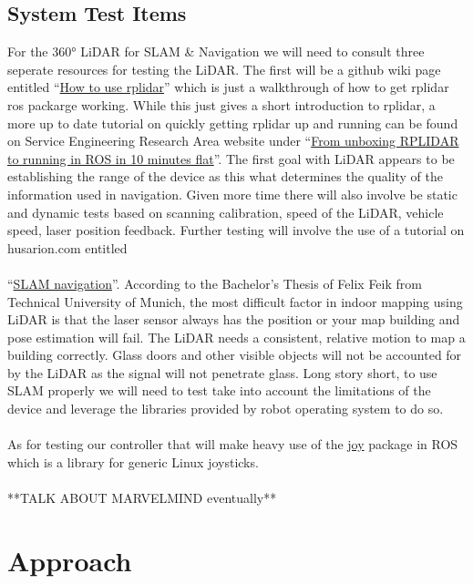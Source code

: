 \documentclass[english,12pt]{article}
\begin{document}
\subsection{System Test Items}
For the \ang{360} LiDAR for SLAM \& Navigation we will need to consult three seperate 
resources for testing the LiDAR. The first will be a github wiki page entitled 
``\href{https://github.com/robopeak/rplidar_ros/wiki/How-to-use-rplidar}{How to use rplidar}'' 
which is just a walkthrough of how to get rplidar ros packarge working. While this just gives 
a short introduction to rplidar, a more up to date tutorial on quickly getting rplidar up and 
running can be found on Service Engineering Research Area website under 
``\href{https://blog.zhaw.ch/icclab/rplidar/}{From unboxing RPLIDAR to running in ROS in 10 
minutes flat}''. The first goal with LiDAR appears to be establishing the range of the device 
as this what determines the quality of the information used in navigation. Given more time 
there will also involve be static and dynamic tests based on scanning calibration, 
speed of the LiDAR, vehicle speed, laser position feedback. Further testing will involve the use 
of a tutorial on husarion.com entitled \\\\
``\href{https://husarion.com/tutorials/ros-tutorials/6-slam-navigation/}{SLAM navigation}''. 
According to the Bachelor's Thesis of Felix Feik from Technical University of Munich,
the most difficult factor in indoor mapping using LiDAR is that the laser sensor always has 
the position or your map building and pose estimation will fail. The LiDAR needs a consistent, 
relative motion to map a building correctly. Glass doors and other visible objects will not 
be accounted for by the LiDAR as the signal will not penetrate glass. Long story short, to use 
SLAM properly we will need to test take into account the limitations of the device and leverage 
the libraries provided by robot operating system to do so. \\\\

As for testing our controller that will make heavy use of the 
\href{http://wiki.ros.org/joy#Microsoft_Xbox_360_Wired_Controller_for_Linux}{joy} 
package in ROS which is a library for generic Linux joysticks. \\\\
**TALK ABOUT MARVELMIND eventually**
\section{Approach}
\end{document}
